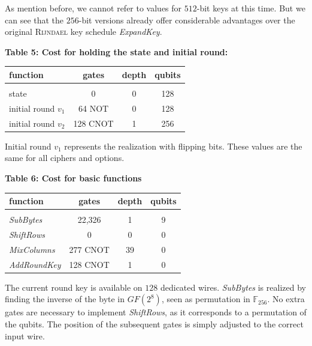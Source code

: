 \documentclass[a4paper,11pt]{article}
\begin{document}
\begin{otherlanguage}{english}
\noindent
As mention before, we cannot refer to values for $512$-bit keys at this time. But we can see that the $256$-bit versions already offer considerable advantages over the original \textsc{Rijndael} key schedule \textit{ExpandKey}. \\

\begin{center}
\textbf{Table 5: Cost for holding the state and initial round:} \\
\vspace{0.2cm}
  \begin{tabular}{l|c|c|c}
  function &  gates & depth & qubits \\ 
  \hline
    &  &  & \\ [-8pt]
  state & 0  &  0 & 128 \\
  initial round $v_1$ & 64 NOT & 0 & 128  \\ 
  initial round $v_2$ & 128 CNOT & 1 & 256  \\ 
  \end{tabular} 
\end{center}
\vspace{0.5cm}

\noindent
Initial round $v_1$ represents the realization with flipping bits. These values are the same for all ciphers and options. \\

\begin{center}
\textbf{Table 6: Cost for basic functions} \\
\vspace{0.2cm}
  \begin{tabular}{l|c|c|c}
  function &  gates & depth & qubits \\ 
  \hline
    &  &  & \\ [-8pt]
  \textit{SubBytes} & 22,326  &  1 & 9 \\
  \textit{ShiftRows} & 0 & 0 & 0  \\ 
  \textit{MixColumns} & 277 CNOT & 39 & 0 \\
  \textit{AddRoundKey} & 128 CNOT &  1 & 0 \\ 
  \end{tabular} 
\end{center}
\vspace{0.5cm}

\noindent
The current round key is available on $128$ dedicated wires. \textit{SubBytes} is realized by finding the inverse of the byte in $GF (2^8)$, seen as permutation in $\mathbb{F}_{256}$.  No extra gates are necessary to implement \textit{ShiftRows}, as it corresponds to a permutation of the qubits. The position of the subsequent gates is simply adjusted to the correct input wire. \\


\end{otherlanguage}
\end{document}
